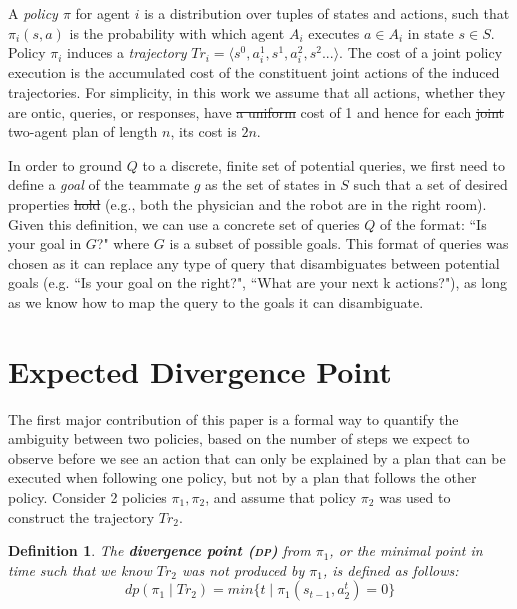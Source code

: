 \documentclass[letterpaper]{article}
\newtheorem{definition}{Definition}
\providecommand{\DIFaddtex}[1]{{\protect\color{blue}\uwave{#1}}} %
\providecommand{\DIFdeltex}[1]{{\protect\color{red}\sout{#1}}}                      %
\providecommand{\DIFaddbegin}{} %
\providecommand{\DIFaddend}{} %
\providecommand{\DIFdelbegin}{} %
\providecommand{\DIFdelend}{} %
\providecommand{\DIFadd}[1]{\texorpdfstring{\DIFaddtex{#1}}{#1}} %
\providecommand{\DIFdel}[1]{\texorpdfstring{\DIFdeltex{#1}}{}} %
\newcommand{\DIFscaledelfig}{0.5}
\newlength{\DIFdelgraphicswidth} %
\newlength{\DIFdelgraphicsheight} %
\newcommand{\DIFaddincludegraphics}[2][]{{\color{blue}\fbox{\DIFOincludegraphics[#1]{#2}}}} %
\newcommand{\DIFdelincludegraphics}[2][]{%
\sbox{\DIFdelgraphicsbox}{\DIFOincludegraphics[#1]{#2}}%
\settoboxwidth{\DIFdelgraphicswidth}{\DIFdelgraphicsbox} %
\settoboxtotalheight{\DIFdelgraphicsheight}{\DIFdelgraphicsbox} %
\scalebox{\DIFscaledelfig}{%
\parbox[b]{\DIFdelgraphicswidth}{\usebox{\DIFdelgraphicsbox}\\[-\baselineskip] \rule{\DIFdelgraphicswidth}{0em}}\llap{\resizebox{\DIFdelgraphicswidth}{\DIFdelgraphicsheight}{%
\setlength{\unitlength}{\DIFdelgraphicswidth}%
\begin{picture}(1,1)%
\thicklines\linethickness{2pt} %
{\color[rgb]{1,0,0}\put(0,0){\framebox(1,1){}}}%
{\color[rgb]{1,0,0}\put(0,0){\line( 1,1){1}}}%
{\color[rgb]{1,0,0}\put(0,1){\line(1,-1){1}}}%
\end{picture}%
}\hspace*{3pt}}} %
} %
\DeclareRobustCommand{\DIFaddbegin}{\DIFOaddbegin \let\includegraphics\DIFaddincludegraphics} %
\DeclareRobustCommand{\DIFaddend}{\DIFOaddend \let\includegraphics\DIFOincludegraphics} %
\DeclareRobustCommand{\DIFdelbegin}{\DIFOdelbegin \let\includegraphics\DIFdelincludegraphics} %
\DeclareRobustCommand{\DIFdelend}{\DIFOaddend \let\includegraphics\DIFOincludegraphics} %
\begin{document}
\DIFdelend A \emph{policy $\pi$} for agent $i$ is a distribution over tuples of states and actions, such that $\pi_{i}(s,a)$ is the probability with which agent $A_i$ executes $a \in A_i$ in state $s \in S$. 
Policy $\pi_i$ induces a \emph{trajectory} $Tr_i=\langle s^0, a_i^1, s^1, a_i^2, s^2... \rangle$.
The cost of a joint policy execution is the accumulated cost of the constituent joint actions of the induced trajectories. For simplicity, in this work we assume that all actions, whether they are ontic, queries, or responses, have \DIFdelbegin \DIFdel{a uniform }\DIFdelend \DIFaddbegin \DIFadd{the }\DIFaddend cost of 1 and hence for each \DIFdelbegin \DIFdel{joint }\DIFdelend two-agent plan of length $n$, its cost is $2n$.

In order to ground $Q$ to a discrete, finite set of potential queries, we first need to define a \emph{goal} of the teammate $g$ as the set of states in $S$ such that a set of desired properties \DIFdelbegin \DIFdel{hold }\DIFdelend \DIFaddbegin \DIFadd{holds }\DIFaddend (e.g., both the physician and the robot are in the right room). Given this definition, we can use a concrete set of queries $Q$ of the format: ``Is your goal in $G$?" where $G$ is a subset of possible goals. This format of queries was chosen as it can replace any type of query that disambiguates between potential goals (e.g. ``Is your goal on the right?", ``What are your next k actions?"), as long as we know how to map the query to the goals it can disambiguate.


\section{Expected Divergence Point}
The first major contribution of this paper is a formal way to quantify the ambiguity between two policies, based on the number of steps we expect to observe before we see an action that can only be explained by a plan that can be executed when following one policy, but not by a plan that follows the other policy. Consider 2 policies $\pi_1,\pi_2$, %
and assume that policy $\pi_2$ was used to construct the trajectory $Tr_2$.  %
\begin{definition}
The \textbf{divergence point (\textsc{dp})} from $\pi_1$, or the minimal point in time such that we know $Tr_2$ was not produced by $\pi_1$, is defined as follows:
\begin{equation*}
    dp(\pi_1 \mid Tr_2) = min\{t \mid \pi_1(s_{t-1}, a_2^t) = 0\}
\end{equation*}
\end{definition}
\end{document}
